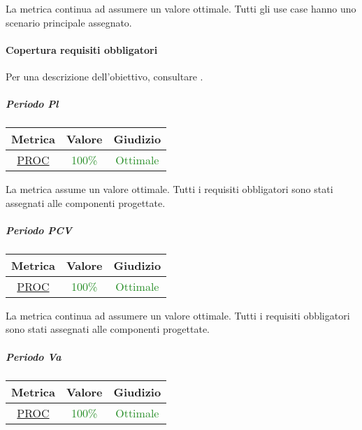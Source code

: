 				La metrica continua ad assumere un valore ottimale. Tutti gli use case hanno uno scenario principale assegnato.
				
				\newpage
				\paragraph{Copertura requisiti obbligatori}
					Per una descrizione dell'obiettivo, consultare .
					\subparagraph{Periodo Pl}
					
					\begin{table}[H]
						\centering
						\begin{tabular}{  c | c | c}
							\hline
							\textbf{Metrica} & \textbf{Valore} & \textbf{Giudizio} \\
							\hline
							\hyperref[MMC]{PROC}   & \textcolor{ForestGreen}{100\%}          & \textcolor{ForestGreen}{Ottimale} \\ \hline
						\end{tabular} 
					\end{table}
				
				La metrica assume un valore ottimale. Tutti i requisiti obbligatori sono stati assegnati alle componenti progettate.
				
				\subparagraph{Periodo PCV}
				
				\begin{table}[H]
					\centering
					\begin{tabular}{  c | c | c}
						\hline
						\textbf{Metrica} & \textbf{Valore} & \textbf{Giudizio} \\
						\hline
						\hyperref[MMC]{PROC}   & \textcolor{ForestGreen}{100\%}          & \textcolor{ForestGreen}{Ottimale} \\ \hline
					\end{tabular} 
				\end{table}
				
				La metrica continua ad assumere un valore ottimale. Tutti i requisiti obbligatori sono stati assegnati alle componenti progettate.
				
				\subparagraph{Periodo Va}
				
				\begin{table}[H]
					\centering
					\begin{tabular}{  c | c | c}
						\hline
						\textbf{Metrica} & \textbf{Valore} & \textbf{Giudizio} \\
						\hline
						\hyperref[MMC]{PROC}   & \textcolor{ForestGreen}{100\%}          & \textcolor{ForestGreen}{Ottimale} \\ \hline
					\end{tabular} 
				\end{table}
				
